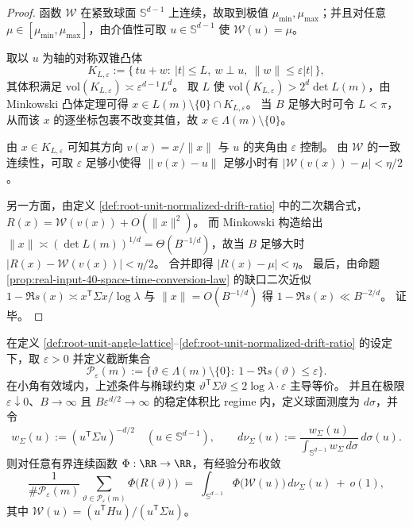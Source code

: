 \begin{proof}
函数 \(\mathcal{W}\) 在紧致球面 \(\mathbb S^{d-1}\) 上连续，故取到极值 \(\mu_{\min},\mu_{\max}\)；并且对任意 \(\mu\in[\mu_{\min},\mu_{\max}]\)，由介值性可取 \(u\in\mathbb S^{d-1}\) 使 \(\mathcal{W}(u)=\mu\)。
\par
取以 \(u\) 为轴的对称双锥凸体
\[
K_{L,\varepsilon}:=\{\,t u+w:\ |t|\le L,\ w\perp u,\ \|w\|\le \varepsilon |t|\,\},
\]
其体积满足 \(\mathrm{vol}(K_{L,\varepsilon})\asymp \varepsilon^{d-1}L^d\)。
取 \(L\) 使 \(\mathrm{vol}(K_{L,\varepsilon})>2^d\det L(m)\)，由 Minkowski 凸体定理可得
\(
x\in L(m)\setminus\{0\}\cap K_{L,\varepsilon}
\)。
当 \(B\) 足够大时可令 \(L<\pi\)，从而该 \(x\) 的逐坐标包裹不改变其值，故 \(x\in\Lambda(m)\setminus\{0\}\)。
\par
由 \(x\in K_{L,\varepsilon}\) 可知其方向 \(v(x)=x/\|x\|\) 与 \(u\) 的夹角由 \(\varepsilon\) 控制。
由 \(\mathcal{W}\) 的一致连续性，可取 \(\varepsilon\) 足够小使得 \(\|v(x)-u\|\) 足够小时有 \(|\mathcal{W}(v(x))-\mu|<\eta/2\)。
\par
另一方面，由定义 \ref{def:root-unit-normalized-drift-ratio} 中的二次耦合式，\(R(x)=\mathcal{W}(v(x))+O(\|x\|^2)\)。
而 Minkowski 构造给出 \(\|x\|\asymp (\det L(m))^{1/d}=\Theta(B^{-1/d})\)，故当 \(B\) 足够大时 \(|R(x)-\mathcal{W}(v(x))|<\eta/2\)。
合并即得 \(|R(x)-\mu|<\eta\)。
最后，由命题 \ref{prop:real-input-40-space-time-conversion-law} 的缺口二次近似 \(1-\Re s(x)\asymp x^{\mathsf T}\Sigma x/\log\lambda\) 与 \(\|x\|=O(B^{-1/d})\) 得 \(1-\Re s(x)\ll B^{-2/d}\)。
证毕。
\end{proof}

\begin{theorem}[漂移比的经验分布律]\label{thm:root-unit-drift-ratio-empirical-law}
在定义 \ref{def:root-unit-angle-lattice}--\ref{def:root-unit-normalized-drift-ratio} 的设定下，取 \(\varepsilon>0\) 并定义截断集合
\[
\mathcal P_{\varepsilon}(m):=\{\vartheta\in\Lambda(m)\setminus\{0\}:\ 1-\Re s(\vartheta)\le \varepsilon\}.
\]
在小角有效域内，上述条件与椭球约束
\(
\vartheta^{\mathsf T}\Sigma\vartheta\le 2\log\lambda\cdot \varepsilon
\)
主导等价。
并且在极限 \(\varepsilon\downarrow 0\)、\(B\to\infty\) 且 \(B\varepsilon^{d/2}\to\infty\) 的稳定体积比 regime 内，定义球面测度为 \(d\sigma\)，并令
\[
w_{\Sigma}(u):=(u^{\mathsf T}\Sigma u)^{-d/2}\quad(u\in\mathbb S^{d-1}),
\qquad
d\nu_{\Sigma}(u):=\frac{w_{\Sigma}(u)}{\int_{\mathbb S^{d-1}} w_{\Sigma}\,d\sigma}\,d\sigma(u).
\]
则对任意有界连续函数 \(\Phi:\RR\to\RR\)，有经验分布收敛
\[
\frac{1}{\#\mathcal P_{\varepsilon}(m)}
\sum_{\vartheta\in\mathcal P_{\varepsilon}(m)} \Phi\bigl(R(\vartheta)\bigr)
\;=\;
\int_{\mathbb S^{d-1}} \Phi\bigl(\mathcal{W}(u)\bigr)\,d\nu_{\Sigma}(u)\ +\ o(1),
\]
其中 \(\mathcal{W}(u)=(u^{\mathsf T}Hu)/(u^{\mathsf T}\Sigma u)\)。
\end{theorem}

